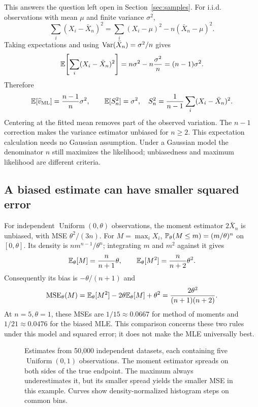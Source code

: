 This answers the question left open in Section~\ref{sec:samples}.
For i.i.d. observations with mean \(\mu\) and finite variance \(\sigma^2\),
\[
  \sum_i(X_i-\bar X_n)^2
  =\sum_i(X_i-\mu)^2-n(\bar X_n-\mu)^2.
\]
Taking expectations and using \(\operatorname{Var}(\bar X_n)=\sigma^2/n\) gives
\[
  \mathbb{E}\!\left[\sum_i(X_i-\bar X_n)^2\right]
  =n\sigma^2-n\frac{\sigma^2}{n}=(n-1)\sigma^2.
\]
Therefore
\begin{equation}
  \mathbb{E}[\widehat v_{\mathrm{ML}}]=\frac{n-1}{n}\sigma^2,
  \qquad
  \mathbb{E}[S_n^2]=\sigma^2,\quad
  S_n^2=\frac1{n-1}\sum_i(X_i-\bar X_n)^2.
  \label{eq:variance-bias-correction}
\end{equation}
Centering at the fitted mean removes part of the observed variation.
The \(n-1\) correction makes the variance estimator unbiased for \(n\ge2\).
This expectation calculation needs no Gaussian assumption. Under a Gaussian
model the denominator \(n\) still maximizes the likelihood; unbiasedness
and maximum likelihood are different criteria.

\subsection{A biased estimate can have smaller squared error}

For independent \(\operatorname{Uniform}(0,\theta)\) observations,
the moment estimator \(2\bar X_n\) is unbiased, with MSE
\(\theta^2/(3n)\). For \(M=\max_iX_i\),
\(\mathbb{P}_\theta(M\le m)=(m/\theta)^n\) on \([0,\theta]\).
Its density is \(nm^{n-1}/\theta^n\); integrating \(m\) and \(m^2\)
against it gives
\[
  \mathbb{E}_\theta[M]=\frac n{n+1}\theta,\qquad
  \mathbb{E}_\theta[M^2]=\frac n{n+2}\theta^2.
\]
Consequently its bias is \(-\theta/(n+1)\) and
\[
  \operatorname{MSE}_\theta(M)
  =\mathbb{E}_\theta[M^2]-2\theta\mathbb{E}_\theta[M]+\theta^2
  =\frac{2\theta^2}{(n+1)(n+2)}.
\]
At \(n=5,\theta=1\), these MSEs are \(1/15\approx0.0667\) for
method of moments and \(1/21\approx0.0476\) for the biased MLE.
This comparison concerns these two rules under this model and squared error;
it does not make the MLE universally best.

\begin{figure}[H]
  \centering\EstUniformPlot
  \caption{Estimates from 50,000 independent datasets, each containing five
  \(\operatorname{Uniform}(0,1)\) observations. The moment estimator spreads
  on both sides of the true endpoint. The maximum always underestimates it,
  but its smaller spread yields the smaller MSE in this example. Curves
  show density-normalized histogram steps on common bins.}
  \label{fig:est-uniform}
\end{figure}

